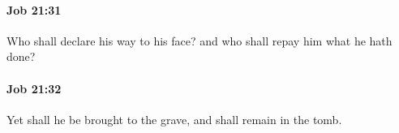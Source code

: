 		\paragraph{Job 21:31} %
			\label{JOB-21-31}

			Who shall declare his way to his face? and who shall repay him what he hath done?


		\paragraph{Job 21:32} %
			\label{JOB-21-32}

			Yet shall he be brought to the grave, and shall remain in the tomb.


